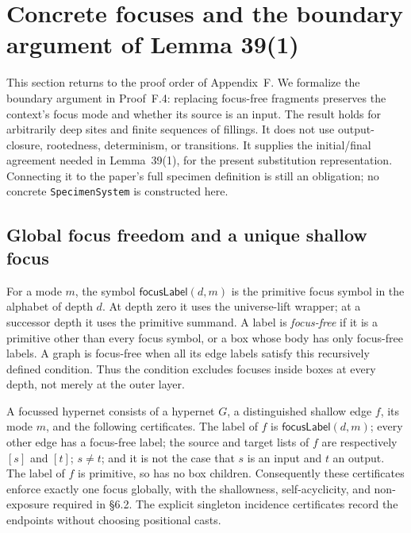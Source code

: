 \section{Concrete focuses and the boundary argument of Lemma 39(1)}
\label{sec:concrete-focus}

This section returns to the proof order of Appendix~F. We formalize the
boundary argument in Proof~F.4: replacing focus-free fragments preserves the
context's focus mode and whether its source is an input. The result holds for
arbitrarily deep sites and finite sequences of fillings. It does not use
output-closure, rootedness, determinism, or transitions. It supplies the
initial/final agreement needed in Lemma~39(1), for the present substitution
representation. Connecting it to the paper's full specimen definition is still
an obligation; no concrete \texttt{SpecimenSystem} is constructed here.

\subsection{Global focus freedom and a unique shallow focus}
\begin{definition}\label{term:focus-free}
For a mode $m$, the symbol $\mathsf{focusLabel}(d,m)$ is the primitive focus
symbol in the alphabet of depth $d$. At depth zero it uses the universe-lift
wrapper; at a successor depth it uses the primitive summand.
A label is \emph{focus-free} if it is a primitive other than every focus symbol,
or a box whose body has only focus-free labels. A graph is focus-free when all
its edge labels satisfy this recursively defined condition. Thus the condition
excludes focuses inside boxes at every depth, not merely at the outer layer.
\end{definition}

\begin{definition}\label{term:focussed-hypernet}
A focussed hypernet consists of a hypernet $G$, a distinguished shallow edge
$f$, its mode $m$, and the following certificates. The label of $f$ is
$\mathsf{focusLabel}(d,m)$; every other edge has a focus-free label; the source
and target lists of $f$ are respectively $[s]$ and $[t]$; $s\ne t$; and it is
not the case that $s$ is an input and $t$ an output.
The label of $f$ is primitive, so has no box children. Consequently these
certificates enforce exactly one focus globally, with the shallowness,
self-acyclicity, and non-exposure required in \S6.2. The explicit singleton
incidence certificates record the endpoints without choosing positional casts.
\end{definition}

